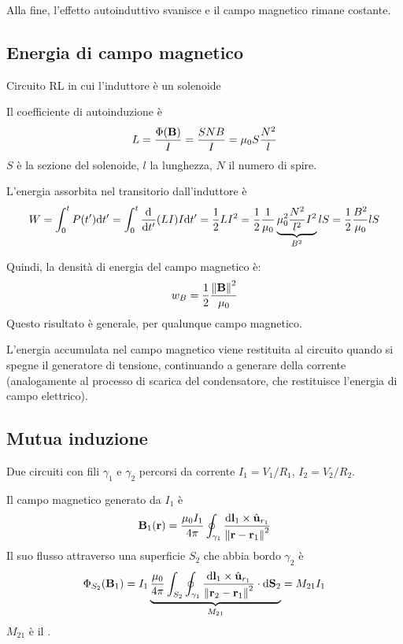 Alla fine, l'effetto autoinduttivo svanisce e il campo magnetico rimane costante.

\subsection{Energia di campo magnetico}
\label{sec:energia_campo_magnetico}

Circuito RL in cui l'induttore è un solenoide

Il coefficiente di autoinduzione è
\begin{equation}
    L = \frac{\Phi(\mathbf{B})}{I} = \frac{S N B}{I} = \mu_0 S \frac{N^2}{l}
\end{equation}
$S$ è la sezione del solenoide, $l$ la lunghezza, $N$ il numero di spire.

L'energia assorbita nel transitorio dall'induttore è
\begin{equation}
    W = \int_0^t P(t') \de t'
    = \int_0^t \der{t'}(L I) I \de t'
    = \frac{1}{2} L I^2
    = \frac{1}{2} \frac{1}{\mu_0} \underbrace{\mu_0^2 \frac{N^2}{l^2} I^2}_{B^2} l S = \frac{1}{2} \frac{B^2}{\mu_0} l S
\end{equation}

Quindi, la densità di energia del campo magnetico è:
\begin{equation}
    w_B = \frac{1}{2} \frac{\left\lVert \mathbf{B} \right\rVert^2}{\mu_0}
\end{equation}
Questo risultato è generale, per qualunque campo magnetico.

L'energia accumulata nel campo magnetico viene restituita al circuito quando si spegne il generatore di tensione, continuando a generare della corrente (analogamente al processo di scarica del condensatore, che restituisce l'energia di campo elettrico).

\subsection{Mutua induzione}


Due circuiti con fili $\gamma_1$ e $\gamma_2$ percorsi da corrente $I_1 = V_1/R_1$, $I_2 = V_2/R_2$.

Il campo magnetico generato da $I_1$ è
\begin{equation}
    \mathbf{B}_1(\mathbf{r}) = \frac{\mu_0 I_1}{4\pi} \oint_{\gamma_1} \frac{\mathrm{d} \mathbf{l}_1 \times \hat{\mathbf{u}}_{r_1}}{\left\lVert \mathbf{r} - \mathbf{r}_1 \right\rVert^2}
\end{equation}
Il suo flusso attraverso una superficie $S_2$ che abbia bordo $\gamma_2$ è
\begin{equation}
    \Phi_{S_2}(\mathbf{B}_1) = I_1 \underbrace{\frac{\mu_0}{4\pi} \int_{S_2} \oint_{\gamma_1} \frac{\mathrm{d} \mathbf{l}_1 \times \hat{\mathbf{u}}_{r_1}}{\left\lVert \mathbf{r}_2 - \mathbf{r}_1 \right\rVert^2} \cdot \mathrm{d} \mathbf{S}_2}_{M_{21}} = M_{21} I_1
\end{equation}
$M_{21}$ è il .

